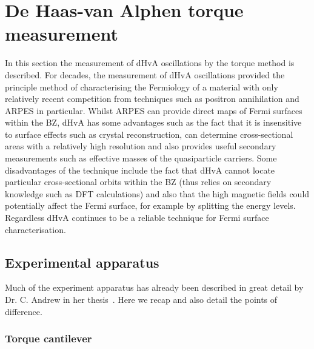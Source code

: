 
\section{De Haas-van Alphen torque measurement}

In this section the measurement of \ac{dHvA} oscillations by the torque method is described. For decades, the measurement of \ac{dHvA} oscillations provided the principle method of characterising the Fermiology of a material with only relatively recent competition from techniques such as positron annihilation and \ac{ARPES} in particular. Whilst \ac{ARPES} can provide direct maps of Fermi surfaces within the \ac{BZ}, \ac{dHvA} has some advantages such as the fact that it is insensitive to surface effects such as crystal reconstruction, can determine cross-sectional areas with a relatively high resolution and also provides useful secondary measurements such as effective masses of the quasiparticle carriers.  Some disadvantages of the technique include the fact that \ac{dHvA} cannot locate particular cross-sectional orbits within the \ac{BZ} (thus relies on secondary knowledge such as \ac{DFT} calculations) and also that the high magnetic fields could potentially affect the Fermi surface, for example by splitting the energy levels. Regardless \ac{dHvA} continues to be a reliable technique for Fermi surface characterisation.

\subsection{Experimental apparatus}

Much of the experiment apparatus has already been described in great detail by Dr. C. Andrew in her thesis~\cite{Andrew2010}. Here we recap and also detail the points of difference. 

\subsubsection{Torque cantilever}

